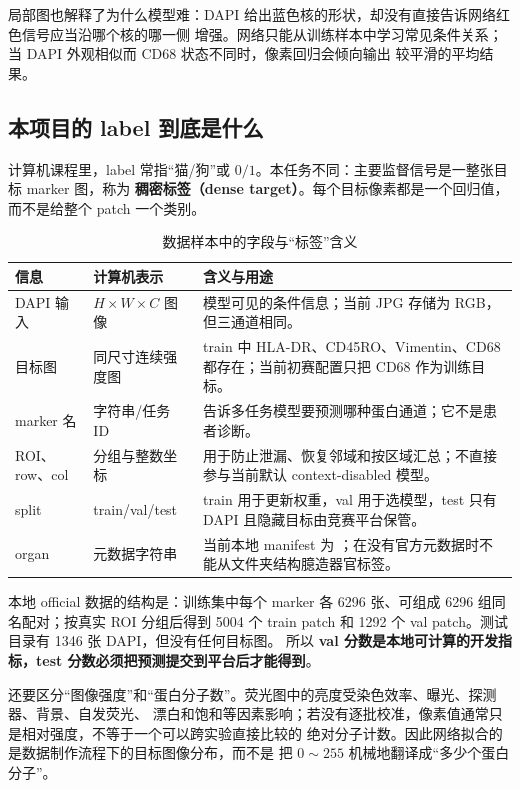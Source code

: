 \documentclass[12pt,a4paper,UTF8]{ctexart}
\newcommand{\code}[1]{\texttt{\detokenize{#1}}}
\newcommand{\term}[2]{\textbf{#1（#2）}}
\begin{document}
局部图也解释了为什么模型难：DAPI 给出蓝色核的形状，却没有直接告诉网络红色信号应当沿哪个核的哪一侧
增强。网络只能从训练样本中学习常见条件关系；当 DAPI 外观相似而 CD68 状态不同时，像素回归会倾向输出
较平滑的平均结果。

\subsection{本项目的 label 到底是什么}

计算机课程里，label 常指“猫/狗”或 $0/1$。本任务不同：主要监督信号是一整张目标 marker 图，称为
\term{稠密标签}{dense target}。每个目标像素都是一个回归值，而不是给整个 patch 一个类别。

\begin{table}[H]
\centering
\caption{数据样本中的字段与“标签”含义}
\label{tab:data-label-semantics}
\begin{tabularx}{\textwidth}{>{\raggedright\arraybackslash}p{}
                              >{\raggedright\arraybackslash}p{}X}
\toprule
信息 & 计算机表示 & 含义与用途 \\
\midrule
DAPI 输入 & $H\times W\times C$ 图像 & 模型可见的条件信息；当前 JPG 存储为 RGB，但三通道相同。\\
目标图 & 同尺寸连续强度图 & train 中 HLA-DR、CD45RO、Vimentin、CD68 都存在；当前初赛配置只把 CD68 作为训练目标。\\
marker 名 & 字符串/任务 ID & 告诉多任务模型要预测哪种蛋白通道；它不是患者诊断。\\
ROI、row、col & 分组与整数坐标 & 用于防止泄漏、恢复邻域和按区域汇总；不直接参与当前默认 context-disabled 模型。\\
split & train/val/test & train 用于更新权重，val 用于选模型，test 只有 DAPI 且隐藏目标由竞赛平台保管。\\
organ & 元数据字符串 & 当前本地 manifest 为 \code{unknown}；在没有官方元数据时不能从文件夹结构臆造器官标签。\\
\bottomrule
\end{tabularx}
\end{table}

本地 official 数据的结构是：训练集中每个 marker 各 6296 张、可组成 6296 组同名配对；按真实 ROI
分组后得到 5004 个 train patch 和 1292 个 val patch。测试目录有 1346 张 DAPI，但没有任何目标图。
所以 \textbf{val 分数是本地可计算的开发指标，test 分数必须把预测提交到平台后才能得到}。

还要区分“图像强度”和“蛋白分子数”。荧光图中的亮度受染色效率、曝光、探测器、背景、自发荧光、
漂白和饱和等因素影响；若没有逐批校准，像素值通常只是相对强度，不等于一个可以跨实验直接比较的
绝对分子计数\cite{fluorescence_quantitation}。因此网络拟合的是数据制作流程下的目标图像分布，而不是
把 $0\sim255$ 机械地翻译成“多少个蛋白分子”。
\end{document}
